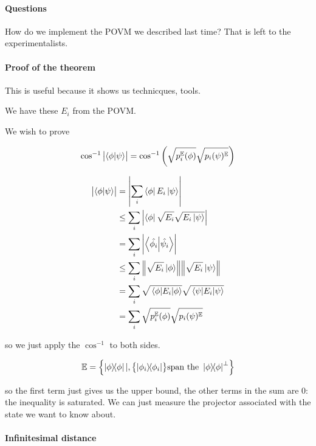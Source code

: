 

\paragraph{Questions}

How do we implement the POVM we described last time? That is left to the experimentalists.

\paragraph{Proof of the theorem}

This is useful because it shows us technicques, tools.

We have these \( E _{i}  \) from the POVM.

We wish to prove

\begin{equation}
  \cos ^{-1} \abs{\braket{\phi}{\psi}}
  = \cos ^{-1} \qty(\sqrt{p_i ^{\mathbb{E}} (\phi)} \sqrt{p_i(\psi)^{\mathbb{E}}})
\end{equation}

\begin{align}
  \abs{\braket{\phi}{\psi}} &= \abs{\sum_i \bra{\phi} E_i \ket{\psi}}  \\
  &\leq \sum_i \abs{\bra{\phi} \sqrt{E _{i} } \sqrt{E _{i} \ket{\psi}}}  \\
  &= \sum _{i} \abs{\braket{\hat{\phi_i}}{\hat{\psi_i}}}  \\
  &\leq \sum_i \norm{\sqrt{E_i} \ket{\phi}}\norm{\sqrt{E_i} \ket{\psi}}  \\
  &= \sum_i \sqrt{\ev{E_i}{\phi}} \sqrt{\ev{E_i}{\psi}}  \\
  &= \sum_i \sqrt{p_i ^{\mathbb{E}} (\phi)} \sqrt{p_i(\psi)^{\mathbb{E}}}
\end{align}

so we just apply the \( \cos ^{-1} \) to both sides.

\begin{equation}
  \mathbb{E} = \qty{\ketbra{\phi} | , \qty{\ketbra{\phi_i}} \text{span the } \ketbra{\phi}^{\perp}}
\end{equation}

so the first term just gives us the upper bound, the other terms in the sum are 0: the inequality is saturated. We can just measure the projector associated with the state we want to know about.

\paragraph{Infinitesimal distance}

